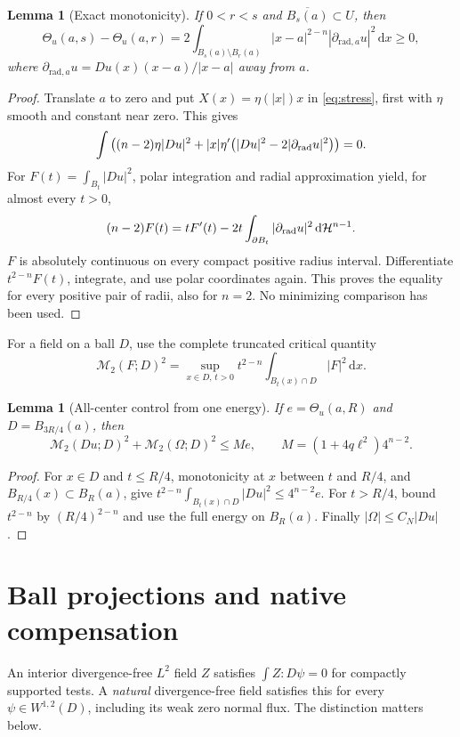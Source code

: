 \documentclass[reqno,11pt]{amsart}
\numberwithin{equation}{section}
\newtheorem{lemma}[theorem]{Lemma}
\theoremstyle{definition}
\theoremstyle{remark}
\newcommand{\dd}{\,\mathrm d}
\newcommand{\dx}{\dd x}
\newcommand{\M}{\mathcal M}
\newcommand{\Th}{\Theta}
\newcommand{\cl}[1]{\overline{#1}}
\begin{document}
\begin{lemma}[Exact monotonicity]\label{lem:monotonicity}
If $0<r<s$ and $\cl{B_s(a)}\subset U$, then
\begin{equation}\label{eq:monotonicity}
 \Th_u(a,s)-\Th_u(a,r)
 =2\int_{B_s(a)\setminus B_r(a)}
 |x-a|^{2-n}|\partial_{\mathrm{rad},a}u|^2\dx\geq0,
\end{equation}
where $\partial_{\mathrm{rad},a}u=Du(x)(x-a)/|x-a|$ away from $a$.
\end{lemma}
\begin{proof}
Translate $a$ to zero and put $X(x)=\eta(|x|)x$ in \eqref{eq:stress},
first with $\eta$ smooth and constant near zero. This gives
\[
 \int\left((n-2)\eta|Du|^2
 +|x|\eta'\bigl(|Du|^2-2|\partial_{\rm rad}u|^2\bigr)\right)=0.
\]
For $F(t)=\int_{B_t}|Du|^2$, polar integration and radial approximation
yield, for almost every $t>0$,
\[
 (n-2)F(t)=tF'(t)-2t\int_{\partial B_t}|\partial_{\rm rad}u|^2
                                      \dd\mathcal H^{n-1}.
\]
$F$ is absolutely continuous on every compact positive radius interval.
Differentiate $t^{2-n}F(t)$, integrate, and use polar coordinates again.
This proves the equality for every positive pair of radii, also for
$n=2$. No minimizing comparison has been used.
\end{proof}

For a field on a ball $D$, use the complete truncated critical quantity
\begin{equation}\label{eq:morrey}
 \M_2(F;D)^2=
 \sup_{x\in D,\,t>0}t^{2-n}\int_{B_t(x)\cap D}|F|^2\dx.
\end{equation}
\begin{lemma}[All-center control from one energy]\label{lem:local-morrey}
If $e=\Th_u(a,R)$ and $D=B_{3R/4}(a)$, then
\begin{equation}\label{eq:joint-smallness}
 \M_2(Du;D)^2+\M_2(\Omega;D)^2\leq M e,\qquad
 M=(1+4q\ell^2)4^{n-2}.
\end{equation}
\end{lemma}
\begin{proof}
For $x\in D$ and $t\leq R/4$, monotonicity at $x$ between $t$ and
$R/4$, and $B_{R/4}(x)\subset B_R(a)$, give
$t^{2-n}\int_{B_t(x)\cap D}|Du|^2\leq4^{n-2}e$.
For $t>R/4$, bound $t^{2-n}$ by $(R/4)^{2-n}$ and use the full
energy on $B_R(a)$. Finally $|\Omega|\leq C_N|Du|$.
\end{proof}

\section{Ball projections and native compensation}\label{sec:analysis}
An interior divergence-free $L^2$ field $Z$ satisfies
$\int Z:D\psi=0$ for compactly supported tests. A \emph{natural}
divergence-free field satisfies this for every $\psi\in W^{1,2}(D)$,
including its weak zero normal flux. The distinction matters below.
\end{document}
